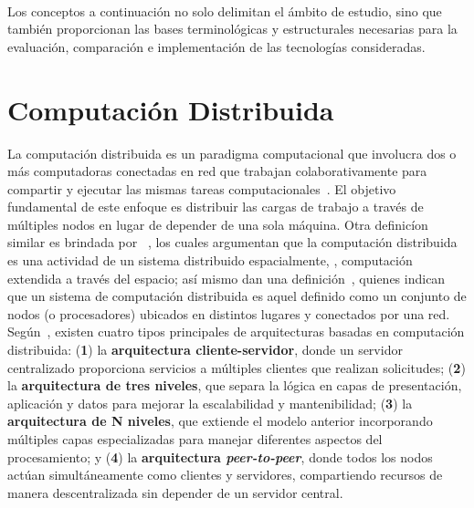 \label{cap:marcoConceptual}
\mbox{}\\

\noindent
Los conceptos a continuación no solo delimitan el ámbito de estudio, sino que también proporcionan las bases terminológicas y estructurales necesarias para la evaluación, comparación e implementación de las tecnologías consideradas.

\noindent
\section{Computación Distribuida}
\noindent
La computación distribuida es un paradigma computacional que involucra dos o más computadoras conectadas en red que trabajan colaborativamente para compartir y ejecutar las mismas tareas computacionales~\citep{Ali2015}. El objetivo fundamental de este enfoque es distribuir las cargas de trabajo a través de múltiples nodos en lugar de depender de una sola máquina. Otra definicíon similar es brindada por ~\cite{Lamport1990}, los cuales argumentan que la computación distribuida es una actividad  de un sistema distribuido espacialmente, \ie, computación extendida a través del espacio; así mismo dan una definición~\cite{Chang1995}, quienes indican que un sistema de computación distribuida es aquel definido como un conjunto de nodos (o procesadores) ubicados en distintos lugares y conectados por una red. Según~\cite{AWS01}, existen cuatro tipos principales de arquitecturas basadas en computación distribuida: (\textbf{1}) la \textbf{arquitectura cliente-servidor}, donde un servidor centralizado proporciona servicios a múltiples clientes que realizan solicitudes; (\textbf{2}) la \textbf{arquitectura de tres niveles}, que separa la lógica en capas de presentación, aplicación y datos para mejorar la escalabilidad y mantenibilidad; (\textbf{3}) la \textbf{arquitectura de N niveles}, que extiende el modelo anterior incorporando múltiples capas especializadas para manejar diferentes aspectos del procesamiento; y (\textbf{4}) la \textbf{arquitectura \textit{peer-to-peer}}, donde todos los nodos actúan simultáneamente como clientes y servidores, compartiendo recursos de manera descentralizada sin depender de un servidor central.

